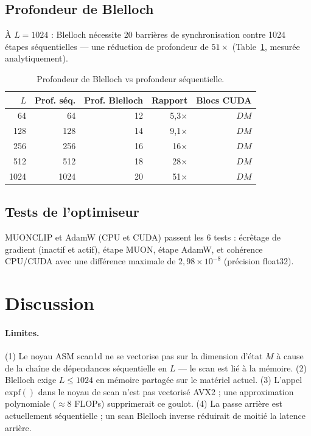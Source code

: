 \documentclass[10pt,onecolumn]{article}
\begin{document}
\subsection{Profondeur de Blelloch}
À $L = 1024$ : Blelloch nécessite 20 barrières de synchronisation contre
1024 étapes séquentielles — une réduction de profondeur de $51\times$
(Table~\ref{tab:blelloch}, mesurée analytiquement).

\begin{table}[htbp]
\centering
\caption{Profondeur de Blelloch vs profondeur séquentielle.}
\label{tab:blelloch}
\begin{tabular}{rrrrr}
\toprule
$L$ & Prof. séq. & Prof. Blelloch & Rapport & Blocs CUDA \\
\midrule
  64 & 64 & 12 & 5,3× & $DM$ \\
 128 & 128 & 14 & 9,1× & $DM$ \\
 256 & 256 & 16 & 16× & $DM$ \\
 512 & 512 & 18 & 28× & $DM$ \\
1024 & 1024 & 20 & 51× & $DM$ \\
\bottomrule
\end{tabular}
\end{table}

\subsection{Tests de l'optimiseur}

MUONCLIP et AdamW (CPU et CUDA) passent les 6 tests :
écrêtage de gradient (inactif et actif), étape MUON, étape AdamW,
et cohérence CPU/CUDA avec une différence maximale de $2,98 \times 10^{-8}$
(précision float32).

\section{Discussion}

\paragraph{Limites.}
(1) Le noyau ASM scan1d ne se vectorise pas sur la dimension d'état $M$
à cause de la chaîne de dépendances séquentielle en $L$ — le scan est lié à la mémoire.
(2) Blelloch exige $L \leq 1024$ en mémoire partagée sur le matériel actuel.
(3) L'appel $\text{expf}()$ dans le noyau de scan n'est pas vectorisé AVX2 ;
une approximation polynomiale ($\approx 8$ FLOPs) supprimerait ce goulot.
(4) La passe arrière est actuellement séquentielle ; un scan Blelloch inverse
réduirait de moitié la latence arrière.
\end{document}
